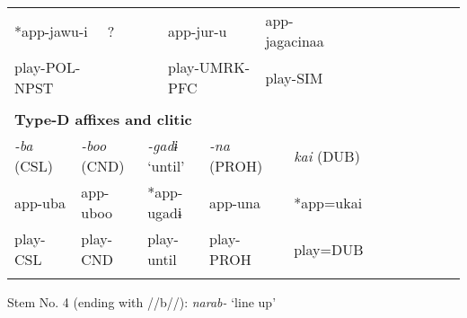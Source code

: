 \begin{tabularx}{\textwidth}{XXXXXXXXXXXXXXXXXXXXXXX}
\multicolumn{3}{X}{{ *app-jawu-i}} & \multicolumn{3}{X}{?} & \multicolumn{5}{X}{app-jur-u} & \multicolumn{4}{X}{{ app-jagacinaa}} & \multicolumn{8}{X}{}\\
\multicolumn{3}{X}{play-POL-NPST} & \multicolumn{3}{X}{} & \multicolumn{5}{X}{play-UMRK-PFC} & \multicolumn{4}{X}{play-SIM} & \multicolumn{8}{X}{}\\
\multicolumn{23}{X}{}\\
\multicolumn{23}{X}{{\bfseries Type-D affixes and clitic}}\\
\multicolumn{2}{X}{{ \textit{{}-ba} (CSL)}} & \multicolumn{3}{X}{{ \textit{{}-boo} (CND)}} & \multicolumn{3}{X}{{ \textit{{}-gadɨ} ‘until’}} & \multicolumn{4}{X}{{ \textit{{}-na} (PROH)}} & \multicolumn{5}{X}{{ \textit{kai} (DUB)}} & \multicolumn{6}{X}{}\\
\multicolumn{2}{X}{{ app-uba}} & \multicolumn{3}{X}{{ app-uboo}} & \multicolumn{3}{X}{{ *app-ugadɨ}} & \multicolumn{4}{X}{{ app-una}} & \multicolumn{5}{X}{{ *app=ukai}} & \multicolumn{6}{X}{}\\
\multicolumn{2}{X}{play-CSL} & \multicolumn{3}{X}{play-CND} & \multicolumn{3}{X}{play-until} & \multicolumn{4}{X}{play-PROH} & \multicolumn{5}{X}{play=DUB} & \multicolumn{6}{X}{}\\
\lspbottomrule
\end{tabularx}
Stem No. 4 (ending with //b//): \textit{narab-} ‘line up’

\tablefirsthead{}

